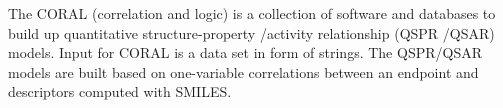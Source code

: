 The CORAL (correlation and logic) is a collection of software and databases to build up quantitative structure-property /activity relationship (QSPR /QSAR) models.  Input for CORAL is a data set in form of strings. The QSPR/QSAR models are built based on one-variable correlations between an endpoint and descriptors computed with SMILES.